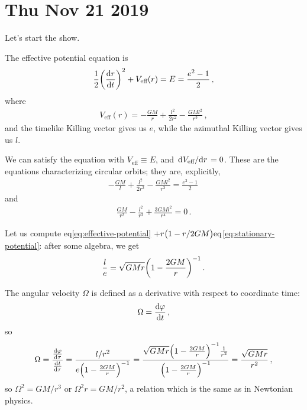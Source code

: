 \documentclass[main.tex]{subfiles}
\begin{document}
\section*{Thu Nov 21 2019}

Let's start the show. 

The effective potential equation is 
%
\begin{align}
  \frac{1}{2} \qty(\dv{r}{t})^2 + V _{\text{eff}} (r)
  = E = \frac{e^2-1}{2} 
\,,
\end{align}
%
where 
%
\begin{align}
  V _{\text{eff}}(r) 
  = - \frac{GM}{r} + \frac{l^2}{2r^2} - \frac{GMl^2}{r^3}
\,,
\end{align}
%
and the timelike Killing vector gives us \(e\), while the azimuthal Killing vector gives us \(l\). 

We can satisfy the equation with \(V _{\text{eff}} \equiv E\), and \(\dv*{V _{\text{eff}}}{r} = 0\). These are the equations characterizing circular orbits; they are, explicitly, 
%
\begin{align} \label{eq:effective-potential}
  -\frac{GM}{l} + \frac{l^2}{2r^2} - \frac{GMl^2}{r^3} = \frac{e^2-1}{2}
\,
\end{align}
%
and 
%
\begin{align} \label{eq:stationary-potential}
  \frac{GM}{r^2} - \frac{l^2}{r^3} + \frac{3GMl^2}{r^{4}}=0
\,.
\end{align}
%

Let us compute \(\text{eq}\)\eqref{eq:effective-potential} \( + r \qty(1 - r/2GM) \text{eq}\)\eqref{eq:stationary-potential}: after some algebra, we get 
%
\begin{align}
  \frac{l}{e} = \sqrt{GMr} \qty(1 - \frac{2GM}{r})^{-1}
\,.
\end{align}

The angular velocity \(\Omega \) is defined as a derivative with respect to coordinate time: 
%
\begin{align}
  \Omega = \dv{\varphi }{t}
\,,
\end{align}
%
so 
%
\begin{align}
  \Omega = \frac{\dv{\varphi }{\tau }}{\dv{t}{\tau }}
  = \frac{l/r^2}{e \qty(1 - \frac{2GM}{r})^{-1}}
  = \frac{\sqrt{GMr} \qty(1- \frac{2GM}{r})^{-1} \frac{1}{r^2}}{\qty(1 - \frac{2GM}{r})^{-1}} = \frac{\sqrt{GMr}}{r^2}
\,,
\end{align}
%
so \(\Omega^2= GM/ r^3\) or \(\Omega^2 r = GM / r^2\), a relation which is the same as in Newtonian physics. 
\end{document}
